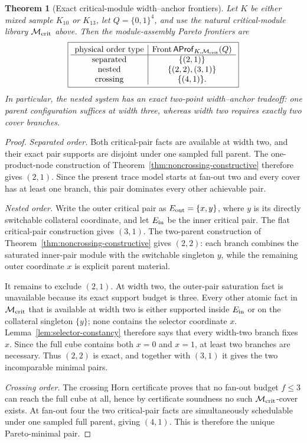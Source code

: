 \documentclass[11pt]{article}
\newtheorem{theorem}[definition]{Theorem}
\newcommand{\Front}{\operatorname{Front}}
\begin{document}
\begin{theorem}[Exact critical-module width--anchor frontiers]
\label{thm:critical-module-pareto}
Let $K$ be either mixed sample $K_{10}$ or $K_{13}$, let
$Q=\{0,1\}^4$, and use the natural critical-module library
$\mathcal M_{\rm crit}$ above.  Then the module-assembly Pareto frontiers are
\[
 \boxed{
 \begin{array}{c|c}
 \text{physical order type}
 &\Front\mathsf{AProf}_{K,\mathcal M_{\rm crit}}(Q)\\
 \hline
 \text{separated}&\{(2,1)\}\\
 \text{nested}&\{(2,2),(3,1)\}\\
 \text{crossing}&\{(4,1)\}.
 \end{array}}
\]
In particular, the nested system has an exact two-point width--anchor
tradeoff: one parent configuration suffices at width three, whereas width two
requires exactly two cover branches.
\end{theorem}

\begin{proof}
\emph{Separated order.}
Both critical-pair facts are available at width two, and their exact pair
supports are disjoint under one sampled full parent.  The one-product-node
construction of Theorem~\ref{thm:noncrossing-constructive} therefore gives
$(2,1)$.  Since the present trace model starts at fan-out two and every cover
has at least one branch, this pair dominates every other achievable pair.

\emph{Nested order.}
Write the outer critical pair as $E_{\rm out}=\{x,y\}$, where $y$ is its
directly switchable collateral coordinate, and let $E_{\rm in}$ be the inner
critical pair.  The flat critical-pair construction gives $(3,1)$.
The two-parent construction of Theorem~\ref{thm:noncrossing-constructive}
gives $(2,2)$: each branch combines the saturated inner-pair module with the
switchable singleton $y$, while the remaining outer coordinate $x$ is explicit
parent material.

It remains to exclude $(2,1)$.  At width two, the outer-pair saturation fact is
unavailable because its exact support budget is three.  Every other atomic fact
in $\mathcal M_{\rm crit}$ that is available at width two is either supported
inside $E_{\rm in}$ or on the collateral singleton $\{y\}$; none contains the
selector coordinate $x$.  Lemma~\ref{lem:selector-constancy} therefore says
that every width-two branch fixes $x$.  Since the full cube contains both
$x=0$ and $x=1$, at least two branches are necessary.  Thus $(2,2)$ is exact,
and together with $(3,1)$ it gives the two incomparable minimal pairs.

\emph{Crossing order.}
The crossing Horn certificate proves that no fan-out budget $f\le3$ can reach
the full cube at all, hence by certificate soundness no such
$\mathcal M_{\rm crit}$-cover exists.  At fan-out four the two critical-pair
facts are simultaneously schedulable under one sampled full parent, giving
$(4,1)$.  This is therefore the unique Pareto-minimal pair.
\end{proof}
\end{document}
